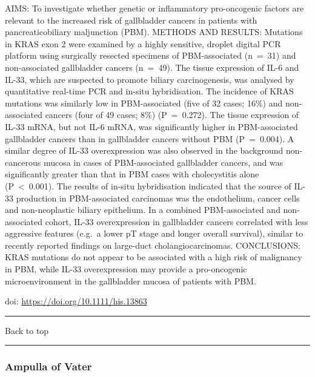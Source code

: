 \documentclass[
]{article}
\renewcommand{\linethickness}{0.05em}
\begin{document}
AIMS: To investigate whether genetic or inflammatory pro-oncogenic
factors are relevant to the increased risk of gallbladder cancers in
patients with pancreaticobiliary maljunction (PBM). METHODS AND RESULTS:
Mutations in KRAS exon 2 were examined by a highly sensitive, droplet
digital PCR platform using surgically resected specimens of
PBM-associated (n~=~31) and non-associated gallbladder cancers (n~=~49).
The tissue expression of IL-6 and IL-33, which are suspected to promote
biliary carcinogenesis, was analysed by quantitative real-time PCR and
in-situ hybridisation. The incidence of KRAS mutations was similarly low
in PBM-associated (five of 32 cases; 16\%) and non-associated cancers
(four of 49 cases; 8\%) (P~=~0.272). The tissue expression of IL-33
mRNA, but not IL-6 mRNA, was significantly higher in PBM-associated
gallbladder cancers than in gallbladder cancers without PBM (P~=~0.004).
A similar degree of IL-33 overexpression was also observed in the
background non-cancerous mucosa in cases of PBM-associated gallbladder
cancers, and was significantly greater than that in PBM cases with
cholecystitis alone (P~\textless~0.001). The results of in-situ
hybridisation indicated that the source of IL-33 production in
PBM-associated carcinomas was the endothelium, cancer cells and
non-neoplastic biliary epithelium. In a combined PBM-associated and
non-associated cohort, IL-33 overexpression in gallbladder cancers
correlated with less aggressive features (e.g.~a lower pT stage and
longer overall survival), similar to recently reported findings on
large-duct cholangiocarcinomas. CONCLUSIONS: KRAS mutations do not
appear to be associated with a high risk of malignancy in PBM, while
IL-33 overexpression may provide a pro-oncogenic microenvironment in the
gallbladder mucosa of patients with PBM.

doi: \url{https://doi.org/10.1111/his.13863}

\begin{center}\rule{0.5\linewidth}{\linethickness}\end{center}

Back to top

\begin{center}\rule{0.5\linewidth}{\linethickness}\end{center}

\pagebreak

\hypertarget{ampulla-of-vater}{%
\subsubsection{Ampulla of Vater}\label{ampulla-of-vater}}
\end{document}
